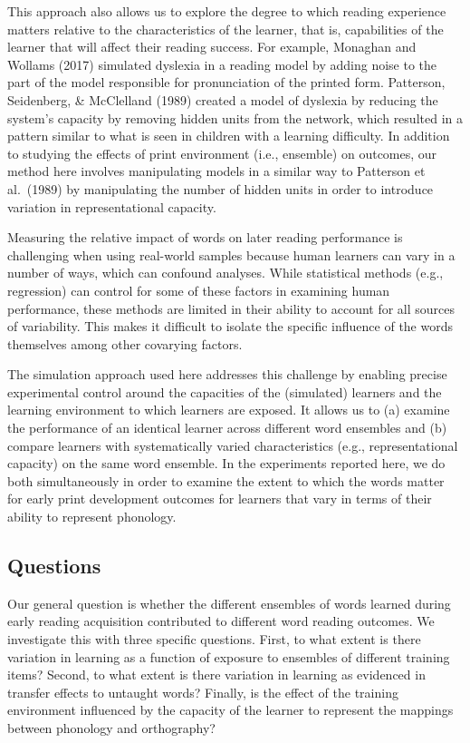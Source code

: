 \documentclass[
  ,man,floatsintext]{apa6}
\begin{document}
This approach also allows us to explore the degree to which reading experience matters relative to the characteristics of the learner, that is, capabilities of the learner that will affect their reading success. For example, Monaghan and Wollams (2017) simulated dyslexia in a reading model by adding noise to the part of the model responsible for pronunciation of the printed form. Patterson, Seidenberg, \& McClelland (1989) created a model of dyslexia by reducing the system's capacity by removing hidden units from the network, which resulted in a pattern similar to what is seen in children with a learning difficulty. In addition to studying the effects of print environment (i.e., ensemble) on outcomes, our method here involves manipulating models in a similar way to Patterson et al.~(1989) by manipulating the number of hidden units in order to introduce variation in representational capacity.

Measuring the relative impact of words on later reading performance is challenging when using real-world samples because human learners can vary in a number of ways, which can confound analyses. While statistical methods (e.g., regression) can control for some of these factors in examining human performance, these methods are limited in their ability to account for all sources of variability. This makes it difficult to isolate the specific influence of the words themselves among other covarying factors.

The simulation approach used here addresses this challenge by enabling precise experimental control around the capacities of the (simulated) learners and the learning environment to which learners are exposed. It allows us to (a) examine the performance of an identical learner across different word ensembles and (b) compare learners with systematically varied characteristics (e.g., representational capacity) on the same word ensemble. In the experiments reported here, we do both simultaneously in order to examine the extent to which the words matter for early print development outcomes for learners that vary in terms of their ability to represent phonology.

\subsection{Questions}\label{questions}

Our general question is whether the different ensembles of words learned during early reading acquisition contributed to different word reading outcomes. We investigate this with three specific questions. First, to what extent is there variation in learning as a function of exposure to ensembles of different training items? Second, to what extent is there variation in learning as evidenced in transfer effects to untaught words? Finally, is the effect of the training environment influenced by the capacity of the learner to represent the mappings between phonology and orthography?
\end{document}
